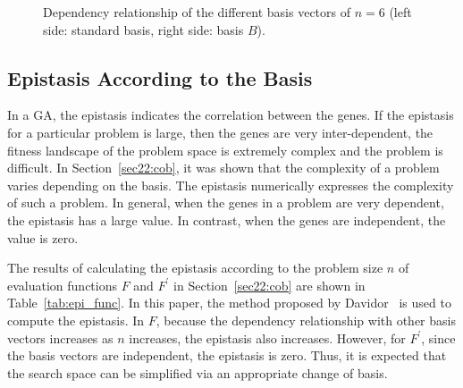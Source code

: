 \begin{figure}[H]
	\centering
	\caption{Dependency relationship of the different basis vectors of $ n = 6 $ (left side: standard basis, right side: basis $ B $).} \label{fig:rel}
\end{figure}

\subsection{Epistasis According to the Basis}
In a GA, the epistasis indicates the correlation between the genes. If the epistasis for a particular problem is large, then the genes are very inter-dependent, the fitness landscape of the problem space is extremely complex and the problem is difficult. In Section~\ref{sec22:cob}, it was shown that the complexity of a problem varies depending on the basis. The epistasis numerically expresses the complexity of such a problem. In general, when the genes in a problem are very dependent, the epistasis has a large value. In contrast, when the genes are independent, the value is zero.

The results of calculating the epistasis according to the problem size $ n $ of evaluation functions $ F $ and $ F^\prime $ in Section~\ref{sec22:cob} are shown in Table~\ref{tab:epi_func}. In this paper, the method proposed by Davidor~\cite{davidor1990epistasis} is used to compute the epistasis. In $ F $, because the dependency relationship with other basis vectors increases as $ n $ increases, the epistasis also increases. However, for $ F^\prime $, since the basis vectors are independent, the epistasis is zero. Thus, it is expected that the search space can be simplified via an appropriate change of basis.

